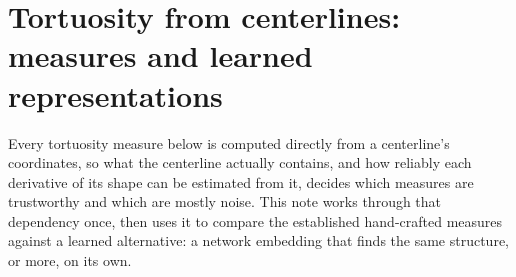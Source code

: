%
%
%
%

\section*{Tortuosity from centerlines: measures and learned representations}

Every tortuosity measure below is computed directly from a centerline's coordinates, so what the
centerline actually contains, and how reliably each derivative of its shape can be estimated from
it, decides which measures are trustworthy and which are mostly noise. This note works through
that dependency once, then uses it to compare the established hand-crafted measures against a
learned alternative: a network embedding that finds the same structure, or more, on its own.

